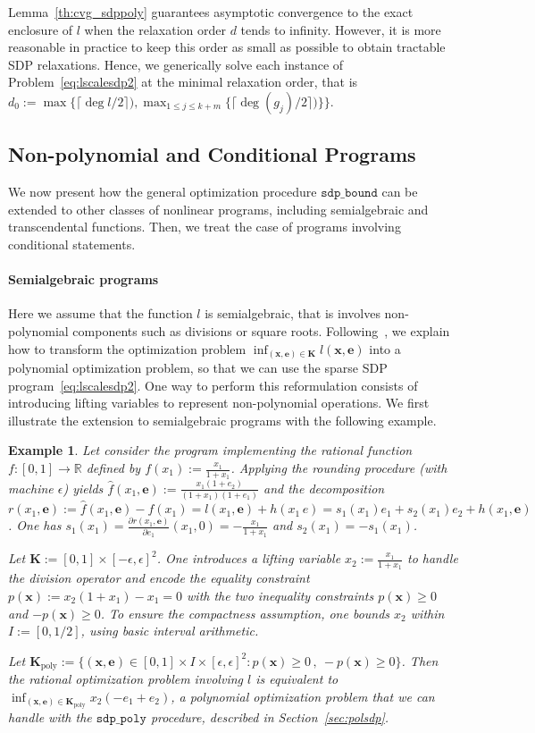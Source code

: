 \documentclass[preprint,fleqn,nocopyrightspace]{sigplanconf}
\newcommand{\R}{\mathbb{R}}
\newcommand{\x}{\mathbf{x}}
\newcommand{\e}{\mathbf{e}}
\def\K{\mathbf{K}}
\newcommand{\Kpol}{\K_{\text{poly}}}
\newcommand{\sdpbound}{\mathtt{sdp\_bound}}
\newcommand{\sdppoly}{\mathtt{sdp\_poly}}
\theoremstyle{plain}
\newtheorem{example}{Example}
\begin{document}
%
Lemma~\ref{th:cvg_sdppoly} guarantees asymptotic convergence to the exact enclosure of $l$ when the relaxation order $d$ tends to infinity. However, it is more reasonable in practice to keep this order as small as possible to obtain tractable SDP relaxations. Hence, we generically solve each instance of Problem~\eqref{eq:lscalesdp2} at the minimal relaxation order, that is $d_0 := \max \{\lceil \deg l / 2\rceil) , \max_{1 \leq j \leq k+m} \{ \lceil \deg (g_j) / 2\rceil) \} \}$. 
%
\subsection{Non-polynomial and Conditional Programs}
\label{sec:nonpolsdp}
We now present how the general optimization procedure $\sdpbound$ can be extended to other classes of nonlinear programs, including semialgebraic and transcendental functions. Then, we treat the case of programs involving conditional statements.
%
\paragraph{Semialgebraic programs}
Here we assume that the function $l$ is semialgebraic, that is involves non-polynomial components such as divisions or square roots.
Following~\cite{LasPut10}, we explain how to transform the optimization problem $\inf_{(\x,\e) \in \K} l (\x, \e)$ into a polynomial optimization problem, so that we can use the sparse SDP program~\eqref{eq:lscalesdp2}. One way to perform this reformulation consists of introducing lifting variables to represent non-polynomial operations.
%
We first illustrate the extension to semialgebraic programs with the following example.
\begin{example}
Let consider the program implementing the rational function $f : [0, 1] \to \R$ defined by $f(x_1) := \frac{x_1}{1 + x_1}$. Applying the rounding procedure (with machine $\epsilon$) yields $\hat{f}(x_1,\e) := \frac{x _1(1 + e_2)}{(1 + x_1)(1 + e_1)}$ and the decomposition $r(x_1, \e) := \hat{f}(x_1,\e) - f(x_1) = l(x_1,\e) + h(x_1\,e) = s_1 (x_1) e_1 + s_2 (x_1) e_2 + h(x_1,\e)$. One has $s_1(x_1) = \frac{\partial r(x_1,\e)} {\partial e_1} (x_1,0) = -\frac{x_1}{1 + x_1}$ and $s_2(x_1) = - s_1(x_1)$.

Let $\K := [0, 1] \times [-\epsilon, \epsilon]^2$. One introduces a lifting variable $x_2 := \frac{x_1}{1 + x_1}$ to handle the division operator and encode the equality constraint $p(\x) :=  x_2 (1 + x_1) - x_1 = 0$ with the two inequality constraints $p (\x) \geq 0$ and $-p(\x) \geq 0$. To ensure the compactness assumption, one bounds $x_2$ within $I := [0, 1/2]$, using basic interval arithmetic.

Let $\Kpol := \{(\x,\e) \in [0, 1] \times I \times [\epsilon, \epsilon]^2 : p(\x) \geq 0 \,,\  - p(\x) \geq 0 \}$. Then the rational optimization problem involving $l$ is equivalent to $\inf_{(\x,\e) \in \Kpol} x_2 (-e_1 + e_2)$, a polynomial optimization problem that we can handle with the $\sdppoly$ procedure, described in Section~\ref{sec:polsdp}.
\end{example}
%
\end{document}
